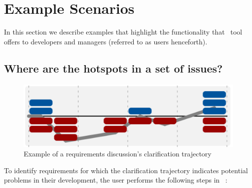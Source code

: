 \section{Example Scenarios}
In this section we describe examples that highlight the functionality that \viss\ tool offers to developers and managers (referred to as users henceforth).

\subsection{Where are the hotspots in a set of issues?}
\begin{figure}[b]
\includegraphics[width=\columnwidth]{img/example-trajectory}
\caption{Example of a requirements discussion's clarification trajectory}
\label{fig:example-trajectory}
\end{figure}
To identify requirements for which the clarification trajectory indicates potential problems in their development, the user performs the following steps in \viss\ :


